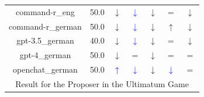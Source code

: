 \documentclass{article}
\newcommand{\bluearrow}[1]{\textcolor{blue}{#1}}
\begin{document}
\begin{table}
\begin{tabular}{ccccccc}
command-r\_eng & 50.0 & $\downarrow$ & \bluearrow{$\downarrow$} & $\downarrow$ & $=$ & $\downarrow $\\
command-r\_german & 50.0 & $\downarrow$ & \bluearrow{$\downarrow$} & $\downarrow$ & $\uparrow$ & $\downarrow $\\
gpt-3.5\_german & 40.0 & $\downarrow$ & \bluearrow{$\downarrow$} & $\downarrow$ & $=$ & $\downarrow $\\
gpt-4\_german & 50.0 & $\downarrow$ & $=$ & $\downarrow$ & $=$ & $= $\\
openchat\_german & 50.0 & \bluearrow{$\uparrow$} & \bluearrow{$\downarrow$} & $\downarrow$ & \bluearrow{$\downarrow$} & $= $\\
         \hline
         \multicolumn{7}{c}{Result for the Proposer in the Ultimatum Game} \\


\end{tabular}
\end{table}
\end{document}
